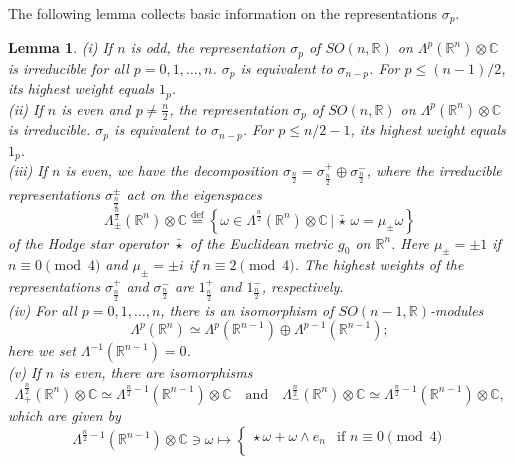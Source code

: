 \documentclass[a4paper,12pt,reqno]{amsart}
\newtheorem{lem}[theorem]{Lemma}
\numberwithin{theorem}{subsection}
\numberwithin{equation}{section}
\begin{document}
The following lemma collects basic information on the representations
$\sigma_p$.

\begin{lem}\label{form-rep} (i) If $n$ is odd, the representation $\sigma_p$ of $SO(n,{\mathbb{R}})$
on $\Lambda^p({\mathbb{R}}^n) \otimes {\mathbb{C}}$ is irreducible for all $p=0,1,\dots,n$.
$\sigma_p$ is equivalent to $\sigma_{n-p}$. For $p \le (n-1)/2$,
its highest weight equals $1_p$. \\
(ii) If $n$ is even and $p \ne \frac{n}{2}$, the representation $\sigma_p$ of
$SO(n,{\mathbb{R}})$ on $\Lambda^p({\mathbb{R}}^n) \otimes {\mathbb{C}}$ is irreducible. $\sigma_p$ is
equivalent to $\sigma_{n-p}$. For $p \le n/2-1$, its highest weight equals
$1_p$. \\
(iii) If $n$ is even, we have the decomposition $\sigma_{\frac{n}{2}} =
\sigma_{\frac{n}{2}}^+ \oplus \sigma_{\frac{n}{2}}^-$, where the irreducible
representations $\sigma_\frac{n}{2}^\pm$ act on the eigenspaces
$$
   \Lambda_\pm^{\frac{n}{2}}({\mathbb{R}}^n) \otimes {\mathbb{C}} {\stackrel{\text{def}}{=}} \left\{ \omega \in
   \Lambda^{\frac{n}{2}}({\mathbb{R}}^n) \otimes {\mathbb{C}} \,|\, \bar{\star} \, \omega = \mu_\pm \omega \right\}
$$
of the Hodge star operator $\bar{\star}$ of the Euclidean metric $g_0$ on
${\mathbb{R}}^n$. Here $\mu_\pm = \pm 1$ if $n \equiv 0 \! \pmod{4}$ and $\mu_\pm = \pm
i$ if $n \equiv 2 \! \pmod{4}$. The highest weights of the representations
$\sigma^+_{\frac{n}{2}}$ and  $\sigma^-_{\frac{n}{2}}$
are $1_{\frac{n}{2}}^+$ and $1_{\frac{n}{2}}^-$, respectively. \\
(iv) For all $p=0,1,\dots,n$, there is an isomorphism of $SO(n-1,{\mathbb{R}})$-modules
\begin{equation*}
   \Lambda^p({\mathbb{R}}^n) \simeq \Lambda^p({\mathbb{R}}^{n-1}) \oplus \Lambda^{p-1}({\mathbb{R}}^{n-1});
\end{equation*}
here we set $\Lambda^{-1}({\mathbb{R}}^{n-1})=0$. \\
(v) If $n$ is even, there are isomorphisms
$$
   \Lambda_+^{\frac{n}{2}}({\mathbb{R}}^n) \otimes {\mathbb{C}} \simeq \Lambda^{\frac{n}{2}-1}({\mathbb{R}}^{n-1}) \otimes {\mathbb{C}}
   \quad \mbox{and} \quad
   \Lambda_-^{\frac{n}{2}}({\mathbb{R}}^n) \otimes {\mathbb{C}} \simeq \Lambda^{\frac{n}{2}-1}({\mathbb{R}}^{n-1}) \otimes {\mathbb{C}},
$$
which are given by
$$
   \Lambda^{\frac{n}{2}-1}({\mathbb{R}}^{n-1}) \otimes {\mathbb{C}} \ni \omega \mapsto
   \begin{cases} \star \, \omega + \omega \wedge e_n & \mbox{if  } n \equiv 0 \!\! \pmod{4} \\

\end{cases}$$
\end{lem}
\end{document}
